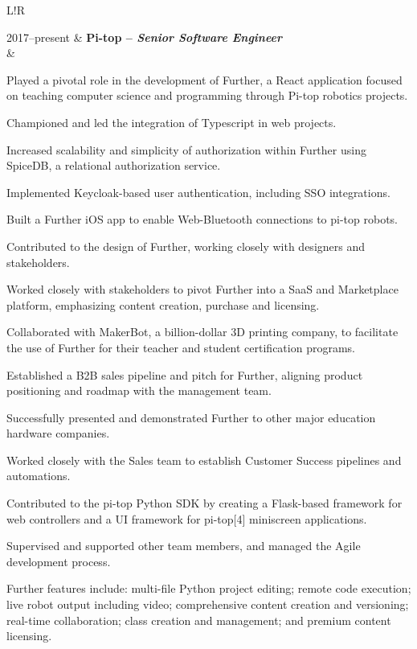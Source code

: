 \documentclass[a4paper,10pt]{article}
\newcommand{\bold}[1]{\textbf{\textcolor{LightBlack}{#1}}}
\newcommand\VerticalRule{\color{Periwinkle!50}\vrule width 0.5pt}
\newenvironment{sectiontable}
{
	\begin{tabular}{L!{\VerticalRule}R}
}
{
	\end{tabular}
}
\begin{document}
\begin{sectiontable}
	2017--present & \bold{Pi-top -- \textit{Senior Software Engineer}}                                                                                                                                                                                                            \\
	              & \begin{items}
		                \item Played a pivotal role in the development of Further, a React application focused on teaching computer science and programming through Pi-top robotics projects.
		                \item Championed and led the integration of Typescript in web projects.
		                \item Increased scalability and simplicity of authorization within Further using SpiceDB, a relational authorization service.
		                \item Implemented Keycloak-based user authentication, including SSO integrations.
		                \item Built a Further iOS app to enable Web-Bluetooth connections to pi-top robots.
		                \item Contributed to the design of Further, working closely with designers and stakeholders.
		                \item Worked closely with stakeholders to pivot Further into a SaaS and Marketplace platform, emphasizing content creation, purchase and licensing.
		                \item Collaborated with MakerBot, a billion-dollar 3D printing company, to facilitate the use of Further for their teacher and student certification programs.
		                \item Established a B2B sales pipeline and pitch for Further, aligning product positioning and roadmap with the management team.
		                \item Successfully presented and demonstrated Further to other major education hardware companies.
		                \item Worked closely with the Sales team to establish Customer Success pipelines and automations.
		                \item Contributed to the pi-top Python SDK by creating a Flask-based framework for web controllers and a UI framework for pi-top[4] miniscreen applications.
		                \item Supervised and supported other team members, and managed the Agile development process.
		                \item Further features include: multi-file Python project editing; remote code execution; live robot output including video; comprehensive content creation and versioning; real-time collaboration; class creation and management; and premium content licensing.
	                \end{items} \\


\end{sectiontable}
\end{document}
